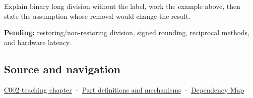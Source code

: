 Explain binary long division without the label, work the example above, then state the assumption whose removal would change the result.

\textbf{Pending:} restoring/non-restoring division, signed rounding, reciprocal methods, and hardware latency.

\subsection{Source and navigation}\label{appendix-89985e6a2685-source-and-navigation}

\hyperref[01-foundations-i-ch001-arithmetic-becomes-a-policy]{C002 teaching chapter} · \hyperref[appendix-fd090d982a15]{Part definitions and mechanisms} · \hyperref[appendix-4ad47bdd269a]{Dependency Map}
